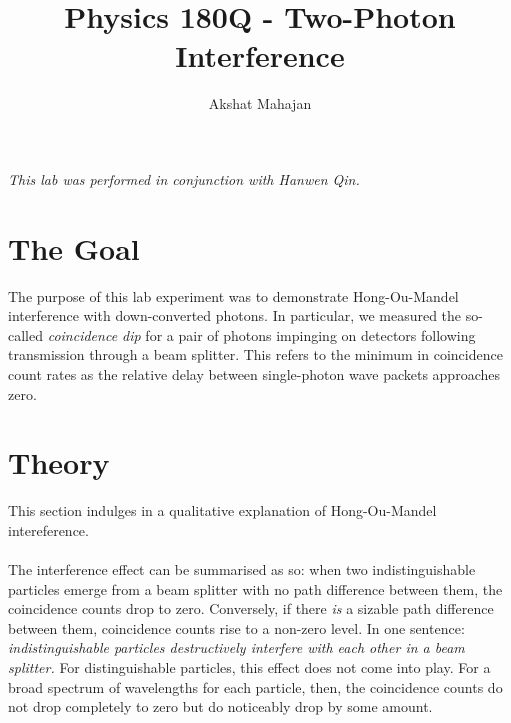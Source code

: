 \documentclass[10pt,a4paper]{article}
\author{Akshat Mahajan}
\title{Physics 180Q - Two-Photon Interference}
\begin{document}
\maketitle
\noindent \textsl{This lab was performed in conjunction with Hanwen Qin.}
\section*{The Goal}
The purpose of this lab experiment was to demonstrate Hong-Ou-Mandel interference with down-converted photons. In particular, we measured the so-called \textit{coincidence dip} for a pair of photons impinging on detectors following transmission through a beam splitter. This refers to the minimum in coincidence count rates as the relative delay between single-photon wave packets approaches zero.
\section*{Theory}
This section indulges in a qualitative explanation of Hong-Ou-Mandel intereference. \\
\\
The interference effect can be summarised as so: when two indistinguishable particles emerge from a beam splitter with no path difference between them, the coincidence counts drop to zero. Conversely, if there \textit{is} a sizable path difference between them, coincidence counts rise to a non-zero level. In one sentence: \textit{indistinguishable particles destructively interfere with each other in a beam splitter.} For distinguishable particles, this effect does not come into play. For a broad spectrum of wavelengths for each particle, then, the coincidence counts do not drop completely to zero but do noticeably drop by some amount.
\end{document}

